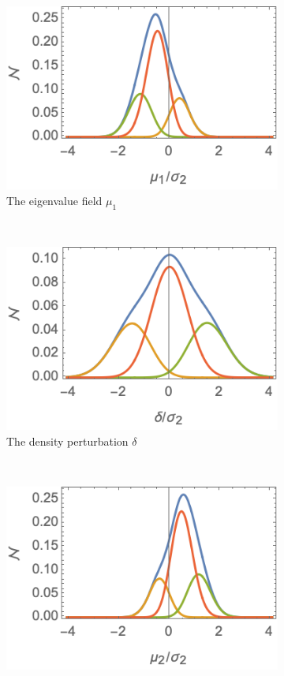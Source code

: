 \documentclass[a4paper, 11pt]{article}
\begin{document}
\begin{figure}
\centering
\begin{subfigure}[b]{0.32\textwidth}
\includegraphics[width=\textwidth]{Critical_lambda_2}
\caption{The eigenvalue field $\mu_1$}
\end{subfigure}~
\begin{subfigure}[b]{0.32\textwidth}
\includegraphics[width=\textwidth]{Critical_dens}
\caption{The density perturbation $\delta$}
\end{subfigure}~
\begin{subfigure}[b]{0.32\textwidth}
\includegraphics[width=\textwidth]{Critical_lambda_1}

\end{subfigure}
\end{figure}
\end{document}
